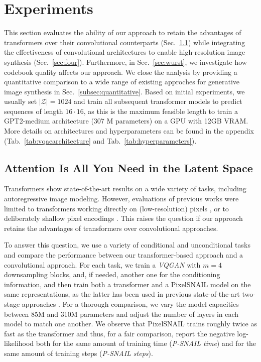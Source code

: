 \documentclass[final]{cvpr}
\newcommand{\codebook}{\mathcal{Z}}
\begin{document}
%
%
\vspace{-0.5em}
\section{Experiments}
\label{sec:experiments}
\enlargethispage{1\baselineskip}
\vspace{-0.5em}
\noindent This section evaluates the ability of our approach to retain the
advantages of transformers over their convolutional counterparts
(Sec.~\ref{sec:psnailvstrafo}) while integrating the effectiveness of
convolutional architectures to enable high-resolution image synthesis
(Sec.~\ref{sec:four}). Furthermore, in Sec.~\ref{sec:wurst}, we investigate how codebook quality affects our approach.
We close the analysis by providing a quantitative comparison to a wide range of existing approches for generative image synthesis in Sec.~\ref{subsec:quantitative}. 
%
%
Based on initial experiments, we usually set $\vert
\codebook \vert=1024$ and train all subsequent transformer models to predict
sequences of length $16\cdot 16$, as this is the maximum feasible length to
train a GPT2-medium architecture (307 M parameters)
\cite{Radford2019LanguageMA} on a GPU with 12GB VRAM. More details on architectures and hyperparameters can be found in the appendix (Tab.~\ref{tab:vqaearchitecture} and Tab.~\ref{tab:hyperparameters}).
%
%

\subsection{Attention Is All You Need in the Latent Space}
\label{sec:psnailvstrafo}
%

\noindent Transformers show state-of-the-art results on a wide variety of tasks,
including autoregressive image modeling. However, evaluations of previous works
were limited to transformers working directly on (low-resolution) pixels
\cite{parmar2018image,child2019generating,ho2019axial}, or to deliberately shallow pixel encodings \cite{chen2020generative}.
This raises the question if our approach retains
the advantages of transformers over convolutional approaches.

To answer this question, we use a variety of conditional and unconditional
tasks and compare the performance between our transformer-based approach and a
convolutional approach. For each task, we train a \emph{VQGAN} with $m=4$
downsampling blocks, and, if needed,
another one for the conditioning information,
and then train both a transformer and a PixelSNAIL \cite{chen2018pixelsnail} model on the same
representations, as the latter has been used
in previous state-of-the-art two-stage approaches \cite{razavi2019generating}.
For a thorough comparison, we vary the model capacities between
85M and 310M parameters and adjust the number of layers in each model to match
one another. We observe that PixelSNAIL trains roughly twice as fast as the
transformer and thus, for a fair comparison, report the negative log-likelihood
both for the same amount of training time (\emph{P-SNAIL time}) and for the same amount of training
steps (\emph{P-SNAIL steps}).
\vspace{-1.1em}
\end{document}
